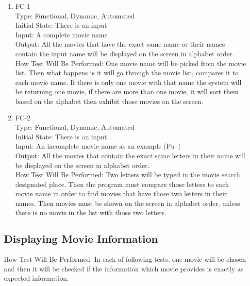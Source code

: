 \documentclass[12pt, titlepage]{article}
\begin{document}
\begin{enumerate}

\item{FC-1\\}
Type:  Functional, Dynamic, Automated\\
Initial State: There is an input\\
Input: A complete movie name \\
Output: All the movies that have the exact same name or their names contain the input name will be displayed on the screen in alphabet order.\\
How Test Will Be Performed: One movie name will be picked from the movie list. Then what happens is it will go through the movie list, compares it to each movie name. If there is only one movie with that name the system will be returning one movie, if there are more than one movie, it will sort them based on the alphabet then exhibit those movies on the screen.

					
\item{FC-2\\}
Type:  Functional, Dynamic, Automated\\
Initial State: There is an input\\
Input: An incomplete movie name as an example (Pu--)\\
Output: All the movies that contain the exact same letters in their name will be displayed on the screen in alphabet order.\\
How Test Will Be Performed: Two letters will be typed in the movie search designated place. Then the program must compare those letters to each movie name in order to find movies that have those two letters in their names. Then movies must be shown on the screen in alphabet order, unless there is no movie in the list with those two letters. 

\end{enumerate}

\subsection{Displaying Movie Information}
How Test Will Be Performed: In each of following tests, one movie will be chosen and then it will be checked if the information which movie provides is exactly as expected information.
\end{document}

